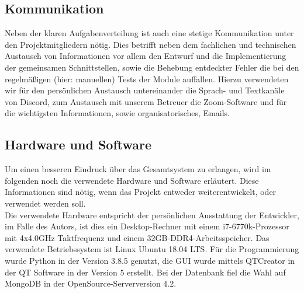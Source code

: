 \subsection{Kommunikation}
Neben der klaren Aufgabenverteilung ist auch eine stetige Kommunikation unter den Projektmitgliedern nötig. Dies betrifft neben dem fachlichen und technischen Austausch von Informationen vor allem den Entwurf und die Implementierung der gemeinsamen Schnittstellen, sowie die Behebung entdeckter Fehler die bei den regelmäßigen (hier: manuellen) Tests der Module auffallen. 
Hierzu verwendeten wir für den persönlichen Austausch untereinander die Sprach- und Textkanäle von Discord, zum Austausch mit unserem Betreuer die Zoom-Software und für die wichtigsten Informationen, sowie organisatorisches, Emails.

\subsection{Hardware und Software}
Um einen besseren Eindruck über das Gesamtsystem zu erlangen, wird im folgenden noch die verwendete Hardware und Software erläutert. Diese Informationen sind nötig, wenn das Projekt entweder weiterentwickelt, oder verwendet werden soll. \\
Die verwendete Hardware entspricht der persönlichen Ausstattung der Entwickler, im Falle des Autors, ist dies ein Desktop-Rechner mit einem i7-6770k-Prozessor mit 4x4.0GHz Taktfrequenz und einem 32GB-DDR4-Arbeitsspeicher. Das verwendete Betriebssystem ist Linux Ubuntu 18.04 LTS. Für die Programmierung wurde Python in der Version 3.8.5 genutzt, die GUI wurde mittels QTCreator in der QT Software in der Version 5 erstellt. Bei der Datenbank fiel die Wahl auf MongoDB in der OpenSource-Serverversion 4.2. 
